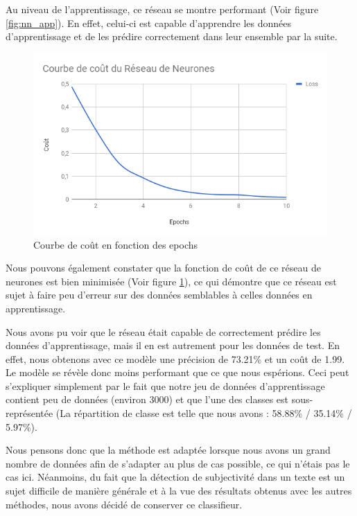 \par Au niveau de l'apprentissage, ce réseau se montre performant (Voir figure \ref{fig:nn_app}). En effet, celui-ci est capable d'apprendre les données d'apprentissage et de les prédire correctement dans leur ensemble par la suite.

\begin{figure}
	\centering
	\includegraphics[scale=0.75]{./img/loss_nn_chart.png}
	\caption{Courbe de coût en fonction des epochs}
	\label{fig:nn_loss}
\end{figure}

\par Nous pouvons également constater que la fonction de coût de ce réseau de neurones est bien minimisée (Voir figure \ref{fig:nn_loss}), ce qui démontre que ce réseau est sujet à faire peu d'erreur sur des données semblables à celles données en apprentissage.

\par Nous avons pu voir que le réseau était capable de correctement prédire les données d'apprentissage, mais il en est autrement pour les données de test. En effet, nous obtenons avec ce modèle une précision de 73.21\% et un coût de 1.99. Le modèle se révèle donc moins performant que ce que nous espérions. Ceci peut s'expliquer simplement par le fait que notre jeu de données d'apprentissage contient peu de données (environ 3000) et que l'une des classes est sous-représentée (La répartition de classe est telle que nous avons : 58.88\% / 35.14\% / 5.97\%).

\par Nous pensons donc que la méthode est adaptée lorsque nous avons un grand nombre de données afin de s'adapter au plus de cas possible, ce qui n'étais pas le cas ici. Néanmoins, du fait que la détection de subjectivité dans un texte est un sujet difficile de manière générale et à la vue des résultats obtenus avec les autres méthodes, nous avons décidé de conserver ce classifieur.

